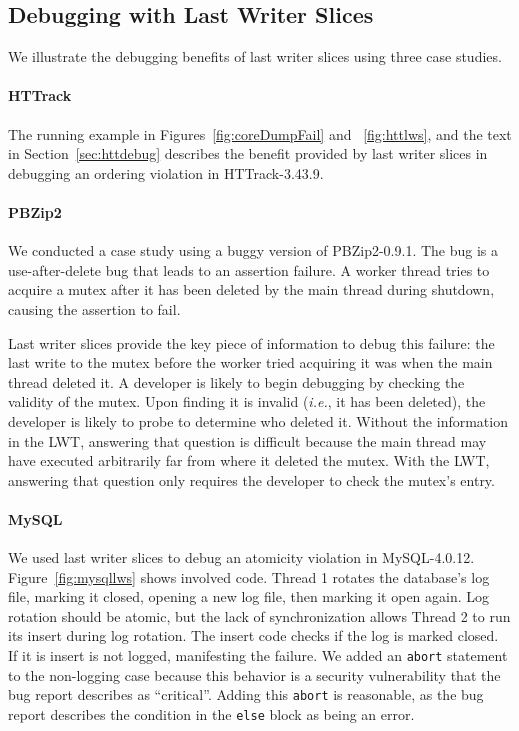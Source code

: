 \documentclass[preprint,9pt]{sigplanconf}
\newcommand{\lwt}{LWT\xspace}
\begin{document}
\subsection{Debugging with Last Writer Slices}
\label{sec:eval:debugging}
We illustrate the debugging benefits of last writer slices using three case
studies.    

\paragraph{HTTrack}
The running example in Figures~\ref{fig:coreDumpFail} and ~\ref{fig:httlws},
and the text in Section~\ref{sec:httdebug} describes the benefit provided by
last writer slices in debugging an ordering violation in HTTrack-3.43.9.  

\paragraph{PBZip2}
We conducted a case study using a buggy version of PBZip2-0.9.1.    The bug is
a use-after-delete bug that leads to an assertion failure.  A worker thread
tries to acquire a mutex after it has been deleted by the main thread during
shutdown, causing the assertion to fail.  

Last writer slices provide the key piece of information to debug this failure:
the last write to the mutex before the worker tried acquiring it was when the
main thread deleted it.  A developer is likely to begin debugging by checking
the validity of the mutex.  Upon finding it is invalid ({\em i.e.}, it has
been deleted), the developer is likely to probe to determine who deleted it.
Without the information in the \lwt, answering that question is difficult
because the main thread may have executed arbitrarily far from where it
deleted the mutex.  With the \lwt, answering that question only requires the
developer to check the mutex's entry.

\paragraph{MySQL}

We used last writer slices to debug an atomicity violation in MySQL-4.0.12.
Figure~\ref{fig:mysqllws} shows involved code.  Thread 1 rotates the database's
log file, marking it closed, opening a new log file, then marking it open
again.  Log rotation should be atomic, but the lack of synchronization allows
Thread 2 to run its insert during log rotation.  The insert code checks if the
log is marked closed. If it is insert is not logged, manifesting the failure.
We added an {\tt abort} statement to the non-logging case because this behavior
is a security vulnerability that the bug report describes as ``critical''.
Adding this {\tt abort} is reasonable, as the bug report describes the
condition in the {\tt else} block as being an error.
\end{document}
